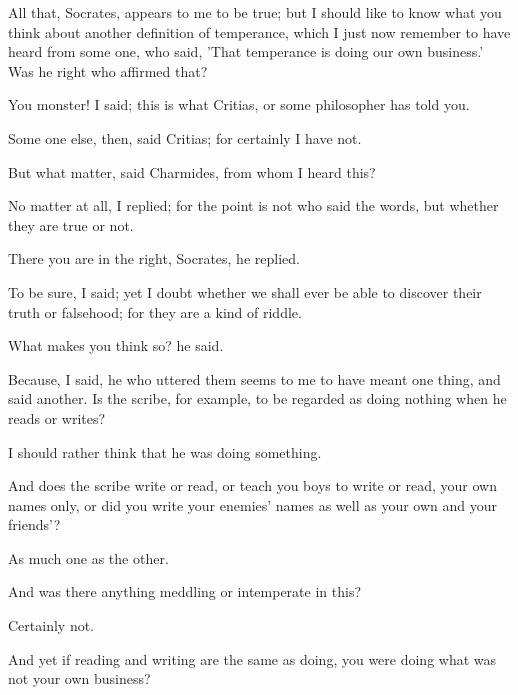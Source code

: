 \documentclass[11pt,letter]{article}
\begin{document}
\par  All that, Socrates, appears to me to be true; but I should like to know what you think about another definition of temperance, which I just now remember to have heard from some one, who said, 'That temperance is doing our own business.' Was he right who affirmed that?

\par  You monster! I said; this is what Critias, or some philosopher has told you.

\par  Some one else, then, said Critias; for certainly I have not.

\par  But what matter, said Charmides, from whom I heard this?

\par  No matter at all, I replied; for the point is not who said the words, but whether they are true or not.

\par  There you are in the right, Socrates, he replied.

\par  To be sure, I said; yet I doubt whether we shall ever be able to discover their truth or falsehood; for they are a kind of riddle.

\par  What makes you think so? he said.

\par  Because, I said, he who uttered them seems to me to have meant one thing, and said another. Is the scribe, for example, to be regarded as doing nothing when he reads or writes?

\par  I should rather think that he was doing something.

\par  And does the scribe write or read, or teach you boys to write or read, your own names only, or did you write your enemies' names as well as your own and your friends'?

\par  As much one as the other.

\par  And was there anything meddling or intemperate in this?

\par  Certainly not.

\par  And yet if reading and writing are the same as doing, you were doing what was not your own business?
\end{document}
